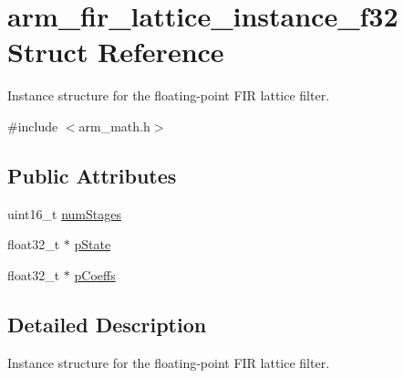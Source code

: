 \hypertarget{structarm__fir__lattice__instance__f32}{\section{arm\-\_\-fir\-\_\-lattice\-\_\-instance\-\_\-f32 Struct Reference}
\label{structarm__fir__lattice__instance__f32}
}


Instance structure for the floating-\/point F\-I\-R lattice filter.  




{\ttfamily \#include $<$arm\-\_\-math.\-h$>$}

\subsection*{Public Attributes}
\begin{DoxyCompactItemize}
\item 
uint16\-\_\-t \hyperlink{structarm__fir__lattice__instance__f32_ad369bd9997a250f195254df37408a38f}{num\-Stages}
\item 
float32\-\_\-t $\ast$ \hyperlink{structarm__fir__lattice__instance__f32_ae348884a1ba9b83fadccd5da640cbcaf}{p\-State}
\item 
float32\-\_\-t $\ast$ \hyperlink{structarm__fir__lattice__instance__f32_a33bf5948c947f9ef80a99717cb0a0a43}{p\-Coeffs}
\end{DoxyCompactItemize}


\subsection{Detailed Description}
Instance structure for the floating-\/point F\-I\-R lattice filter. 

